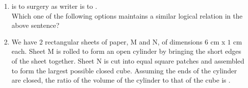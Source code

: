 \documentclass[a4paper, 11pt]{article}
\begin{document}
\begin{enumerate}
    \item \underline{\hspace{2cm}} is to surgery as writer is to \underline{\hspace{2cm}}.\\Which one of the following options maintains a similar logical relation in the above sentence?
    \begin{enumerate}
    \end{enumerate}
    \hfill{}

    \item We have $2$ rectangular sheets of paper, M and N, of dimensions $6$ cm x $1$ cm each. Sheet M is rolled to form an open cylinder by bringing the short edges of the sheet together. Sheet N is cut into equal square patches and assembled to form the largest possible closed cube. Assuming the ends of the cylinder are closed, the ratio of the volume of the cylinder to that of the cube is \underline{\hspace{2cm}}.
    \begin{enumerate}
    \end{enumerate}
    \hfill{}


\end{enumerate}
\end{document}
